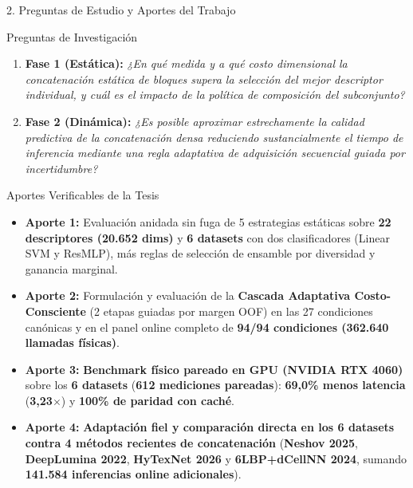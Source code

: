 \documentclass[aspectratio=169,10pt]{beamer}
\begin{document}
\begin{frame}{2. Preguntas de Estudio y Aportes del Trabajo}
\begin{block}{Preguntas de Investigación}
\begin{enumerate}
\item \textbf{Fase 1 (Estática):} \emph{¿En qué medida y a qué costo dimensional la concatenación estática de bloques supera la selección del mejor descriptor individual, y cuál es el impacto de la política de composición del subconjunto?}
\item \textbf{Fase 2 (Dinámica):} \emph{¿Es posible aproximar estrechamente la calidad predictiva de la concatenación densa reduciendo sustancialmente el tiempo de inferencia mediante una regla adaptativa de adquisición secuencial guiada por incertidumbre?}
\end{enumerate}
\end{block}

\begin{exampleblock}{Aportes Verificables de la Tesis}
\begin{itemize}
\item \textbf{Aporte 1:} Evaluación anidada sin fuga de 5 estrategias estáticas sobre \textbf{22 descriptores (20.652 dims)} y \textbf{6 datasets} con dos clasificadores (Linear SVM y ResMLP), más reglas de selección de ensamble por diversidad y ganancia marginal.
\item \textbf{Aporte 2:} Formulación y evaluación de la \textbf{Cascada Adaptativa Costo-Consciente} (2 etapas guiadas por margen OOF) en las 27 condiciones canónicas y en el panel online completo de \textbf{94/94 condiciones (362.640 llamadas físicas)}.
\item \textbf{Aporte 3:} \textbf{Benchmark físico pareado en GPU (NVIDIA RTX 4060)} sobre los \textbf{6 datasets} (\textbf{612 mediciones pareadas}): \textbf{69,0\% menos latencia} (\textbf{3,23$\times$}) y \textbf{100\% de paridad con caché}.
\item \textbf{Aporte 4:} \textbf{Adaptación fiel y comparación directa en los 6 datasets contra 4 métodos recientes de concatenación} (\textbf{Neshov 2025}, \textbf{DeepLumina 2022}, \textbf{HyTexNet 2026} y \textbf{6LBP+dCellNN 2024}, sumando \textbf{141.584 inferencias online adicionales}).
\end{itemize}
\end{exampleblock}
\end{frame}
\end{document}
